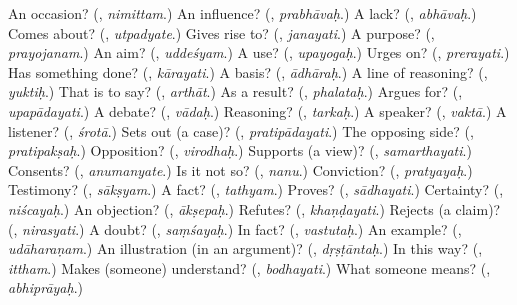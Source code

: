 \begin{tcolorbox}[breakable,colback=teal!4,colframe=teal!35!black,title={Before you move on}]
An occasion? (\textbf{}, \emph{nimittam}.) An influence? (\textbf{}, \emph{prabhāvaḥ}.) A lack? (\textbf{}, \emph{abhāvaḥ}.) Comes about? (\textbf{}, \emph{utpadyate}.) Gives rise to? (\textbf{}, \emph{janayati}.) A purpose? (\textbf{}, \emph{prayojanam}.) An aim? (\textbf{}, \emph{uddeśyam}.) A use? (\textbf{}, \emph{upayogaḥ}.) Urges on? (\textbf{}, \emph{prerayati}.) Has something done? (\textbf{}, \emph{kārayati}.) A basis? (\textbf{}, \emph{ādhāraḥ}.) A line of reasoning? (\textbf{}, \emph{yuktiḥ}.) That is to say? (\textbf{}, \emph{arthāt}.) As a result? (\textbf{}, \emph{phalataḥ}.) Argues for? (\textbf{}, \emph{upapādayati}.) A debate? (\textbf{}, \emph{vādaḥ}.) Reasoning? (\textbf{}, \emph{tarkaḥ}.) A speaker? (\textbf{}, \emph{vaktā}.) A listener? (\textbf{}, \emph{śrotā}.) Sets out (a case)? (\textbf{}, \emph{pratipādayati}.) The opposing side? (\textbf{}, \emph{pratipakṣaḥ}.) Opposition? (\textbf{}, \emph{virodhaḥ}.) Supports (a view)? (\textbf{}, \emph{samarthayati}.) Consents? (\textbf{}, \emph{anumanyate}.) Is it not so? (\textbf{}, \emph{nanu}.) Conviction? (\textbf{}, \emph{pratyayaḥ}.) Testimony? (\textbf{}, \emph{sākṣyam}.) A fact? (\textbf{}, \emph{tathyam}.) Proves? (\textbf{}, \emph{sādhayati}.) Certainty? (\textbf{}, \emph{niścayaḥ}.) An objection? (\textbf{}, \emph{ākṣepaḥ}.) Refutes? (\textbf{}, \emph{khaṇḍayati}.) Rejects (a claim)? (\textbf{}, \emph{nirasyati}.) A doubt? (\textbf{}, \emph{saṃśayaḥ}.) In fact? (\textbf{}, \emph{vastutaḥ}.) An example? (\textbf{}, \emph{udāharaṇam}.) An illustration (in an argument)? (\textbf{}, \emph{dṛṣṭāntaḥ}.) In this way? (\textbf{}, \emph{ittham}.) Makes (someone) understand? (\textbf{}, \emph{bodhayati}.) What someone means? (\textbf{}, \emph{abhiprāyaḥ}.)
\end{tcolorbox}
